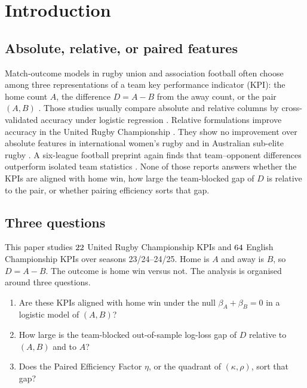 \section{Introduction}

\subsection{Absolute, relative, or paired features}

Match-outcome models in rugby union and association football often choose among three representations of a team key performance indicator (KPI): the home count $A$, the difference $D=A-B$ from the away count, or the pair $(A,B)$ \parencite{bennett2019descriptive,bennett2021predicting,mosey2020,scott2023urc,scott2023womens}.
Those studies usually compare absolute and relative columns by cross-validated accuracy under logistic regression \parencite{dixon1997,berrar2019}.
Relative formulations improve accuracy in the United Rugby Championship \parencite{scott2023urc}.
They show no improvement over absolute features in international women's rugby \parencite{scott2023womens} and in Australian sub-elite rugby \parencite{mosey2020}.
A six-league football preprint again finds that team--opponent differences outperform isolated team statistics \parencite{brito2026}.
None of those reports answers whether the KPIs are aligned with home win, how large the team-blocked gap of $D$ is relative to the pair, or whether pairing efficiency sorts that gap.

\subsection{Three questions}

This paper studies $22$ United Rugby Championship KPIs and $64$ English Championship KPIs over seasons 23/24--24/25.
Home is $A$ and away is $B$, so $D=A-B$.
The outcome is home win versus not.
The analysis is organised around three questions.

\begin{enumerate}
  \item Are these KPIs aligned with home win under the null $\beta_A+\beta_B=0$ in a logistic model of $(A,B)$?
  \item How large is the team-blocked out-of-sample log-loss gap of $D$ relative to $(A,B)$ and to $A$?
  \item Does the Paired Efficiency Factor $\eta$, or the quadrant of $(\kappa,\rho)$, sort that gap?
\end{enumerate}

